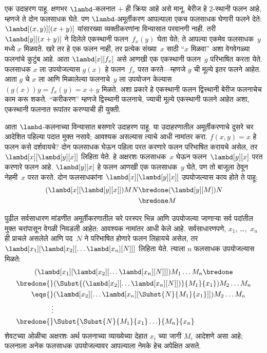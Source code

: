 एक उदाहरण पाहू. क्षणभर $\lambd$-कलनात $+$ ही क्रिया आहे
असे मानू. बेरीज हे $2$-स्थानी फलन आहे, म्हणजे ते दोन फलसाधक
घेते. पण $\lambd$-अमूर्तीकरण आपल्याला एकच फलसाधक घेणारी फलने
देते: $\lambd[(x,y)][(x+y)]$ यांसारख्या व्यक्तीकरणांना विन्यासात
परवानगी नाही. तरी $\lambd[y][(x+y)]$ ने दिलेले एकस्थानी
फलन~$f_x(y)$ घेता येते; ते आपल्या एकमेव फलसाधक~$y$ मध्ये
$x$ मिळवते. खरे तर हे एक फलन नाही, तर प्रत्येक संख्या~$x$
साठी “$x$ मिळवा” अशा वेगवेगळ्या फलनांचे कुटुंब आहे. आता
$\lambd[x][f_x]$ असे आणखी एक एकस्थानी फलन~$g$ परिभाषित
करता येते. फलसाधक $x$ ला उपयोजल्यास $g(x)$ हे
फलन~$f_x$ परत करते---म्हणजे $g$ ची मूल्ये इतर फलने आहेत.
आता $g$ चे $x$ ला आणि मिळालेल्या फलनाचे~$y$ ला उपयोजन
केल्यास $(g(x))y = f_x(y) = x+y$ मिळते. अशा प्रकारे हे एकस्थानी फलन द्विस्थानी बेरीज फलनाचेच काम करू शकते.
“करीकरण” म्हणजे द्विस्थानी फलनाचे, ज्याची मूल्ये एकस्थानी
फलने आहेत अशा, एकस्थानी फलनात रूपांतर करण्याची ही युक्ती.


आता $\lambd$-कलनाच्या विन्यासात बसणारे उदाहरण पाहू.
या उदाहरणातील अमूर्तीकरणाचे दुसरे चर आदेशित पहिल्या पदात
मुक्त नसावे; आवश्यक असल्यास त्याचे आधी नामांतर करा.
$f(x,y) = x$ हे फलन कसे दर्शवायचे? दोन फलसाधक घेऊन
पहिला परत करणारे फलन परिभाषित करायचे असेल, तर
$\lambd[x][\lambd[y][x]]$ लिहिता येते. हे अक्षरशः
फलसाधक~$x$ घेऊन फलन~$\lambd[y][x]$ परत करणारे फलन आहे.
$\lambd[y][x]$ हे फलन आणखी एक फलसाधक~$y$ घेते,
पण तो बाजूला ठेवून नेहमी~$x$ परत करते. दोन फलसाधकांना
$\lambd[x][\lambd[y][x]]$ उपयोजल्यास काय होते ते पाहू:
\begin{align*}
  (\lambd[x][\lambd[y][x]])MN
  \bredone & (\lambd[y][M])N \\
  \bredone & M
\end{align*}

पुढील सर्वसाधारण मांडणीत अमूर्तीकरणातील चरे परस्पर भिन्न
आणि उपयोजल्या जाणाऱ्या सर्व पदांतील मुक्त चरांपासून वेगळी
निवडली आहेत; आवश्यक नामांतर आधी केले आहे.
सर्वसाधारणपणे, $x_1$, \dots,~$x_n$ ही प्राचले असलेले
आणि पद~$N$ ने परिभाषित होणारे फलन लिहायचे असेल,
तर $\lambd[x_1][\lambd[x_2][\ldots\lambd[x_n][N]]]$
लिहिता येते. त्याला $n$ फलसाधक उपयोजल्यास मिळते:
\begin{multline*}
  (\lambd[x_1][\lambd[x_2][\ldots\lambd[x_n][N]]]) M_1 \dots M_n \bredone\\
  \begin{aligned}
  \bredone {} & (\Subst{(\lambd[x_2][\ldots\lambd[x_n][N]])}{M_1}{x_1}) M_2
  \dots M_n\\
   \eqs {} & (\lambd[x_2][\ldots\lambd[x_n][\Subst{N}{M_1}{x_1}]]) M_2
            \dots M_n \\
  \vdots & \\
  \bredone {} &\Subst{\Subst{N}{M_1}{x_1}\ldots}{M_n}{x_n}
  \end{aligned}
\end{multline*}
शेवटच्या ओळीचा अक्षरशः अर्थ फलनाच्या व्याख्येच्या देहात
$x_i$ च्या जागी $M_i$ आदेशणे असा आहे; फलनाला अनेक
फलसाधक उपयोजल्यावर आपल्याला नेमके हेच अपेक्षित असते.










